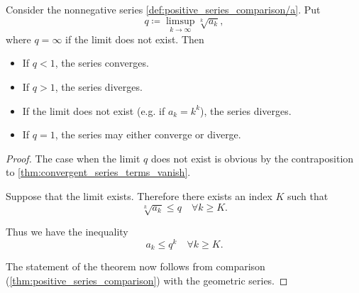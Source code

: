 \begin{proposition}\label{thm:cauchys_root_test}\cite[theorem 3.33]{Rudin1976}
  Consider the nonnegative series \cref{def:positive_series_comparison/a}. Put
  \begin{equation*}
    q \coloneqq \limsup_{k \to \infty} \sqrt[k]{a_k},
  \end{equation*}
  where \( q = \infty \) if the limit does not exist. Then
  \begin{itemize}
    \item If \( q < 1 \), the series converges.
    \item If \( q > 1 \), the series diverges.
    \item If the limit does not exist (e.g. if \( a_k = k^k \)), the series diverges.
    \item If \( q = 1 \), the series may either converge or diverge.
  \end{itemize}
\end{proposition}
\begin{proof}
  The case when the limit \( q \) does not exist is obvious by the contraposition to \cref{thm:convergent_series_terms_vanish}.

  Suppose that the limit exists. Therefore there exists an index \( K \) such that
  \begin{equation*}
    \sqrt[k]{a_k} \leq q \quad\forall k \geq K.
  \end{equation*}

  Thus we have the inequality
  \begin{equation*}
    a_k \leq q^k \quad\forall k \geq K.
  \end{equation*}

  The statement of the theorem now follows from comparison (\cref{thm:positive_series_comparison}) with the geometric series.
\end{proof}

